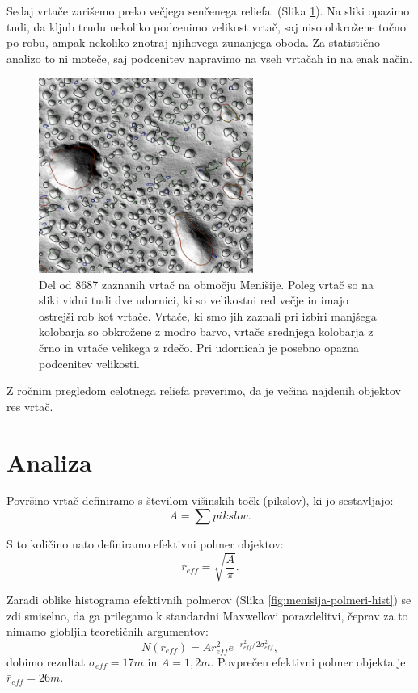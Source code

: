 \documentclass[a4paper, twoside, 12pt]{book}
\begin{document}
Sedaj vrtače zarišemo preko večjega senčenega reliefa: (Slika \ref{fig:menisija-vrtace}). Na sliki opazimo tudi, da kljub trudu nekoliko podcenimo velikost vrtač, saj niso obkrožene točno po robu, ampak nekoliko znotraj njihovega zunanjega oboda. Za statistično analizo to ni moteče, saj podcenitev napravimo na vseh vrtačah in na enak način.
  \begin{figure}[h]
    \begin{center}
      \includegraphics[width=7cm]{slike/menisija-vrtace}
    \end{center}
    \caption{Del od 8687 zaznanih vrtač na območju Menišije. Poleg vrtač so na sliki vidni tudi dve udornici, ki so velikostni red večje in imajo ostrejši rob kot vrtače. Vrtače, ki smo jih zaznali pri izbiri manjšega kolobarja so obkrožene z modro barvo, vrtače srednjega kolobarja z črno in vrtače velikega z rdečo. Pri udornicah je posebno opazna podcenitev velikosti.}
    \label{fig:menisija-vrtace}
  \end{figure}

Z ročnim pregledom celotnega reliefa preverimo, da je večina najdenih objektov res vrtač.

  \section{Analiza}

  Površino vrtač definiramo s številom višinskih točk (pikslov), ki jo sestavljajo:
    \begin{equation}
      A = \sum pikslov.
    \end{equation}

S to količino nato definiramo efektivni polmer objektov:
    \begin{equation} 
      r_{eff} = \sqrt{\frac{A}{\pi}}. 
    \end{equation}

Zaradi oblike histograma efektivnih polmerov (Slika \ref{fig:menisija-polmeri-hist}) se zdi smiselno, da ga prilegamo k standardni Maxwellovi porazdelitvi, čeprav za to nimamo globljih teoretičnih argumentov:
\begin{equation} 
  N(r_{eff}) = A r_{eff}^2 e^{-r_{eff}^2/ 2 \sigma_{eff}^2},
\end{equation}
dobimo rezultat $\sigma_{eff}=17m$ in $A=1,2m$. Povprečen efektivni polmer objekta je $\bar r_{eff}=26m$.
\end{document}
